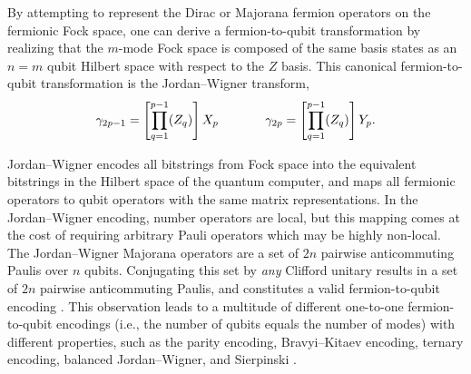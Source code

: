 \documentclass[%
 aip,
 amsmath,amssymb,
 reprint,%
]{revtex4-1}
\begin{document}
\indent By attempting to represent the Dirac or Majorana fermion operators on the fermionic Fock space, one can derive a fermion-to-qubit transformation by realizing that the $m$-mode Fock space is composed of the same basis states as an $n\!=\!m$ qubit Hilbert space with respect to the $Z$ basis. This canonical fermion-to-qubit transformation is the Jordan--Wigner transform, 
\begin{equation}
    \gamma_{2p-1} = \left[\prod_{q=1}^{p-1}(Z_q)\right]X_p \hspace{1.3cm} \gamma_{2p} = \left[\prod_{q=1}^{p-1}(Z_q)\right]Y_p.
    \label{eq:jordan-wigner-transform}
\end{equation}

Jordan--Wigner encodes all bitstrings from Fock space into the equivalent bitstrings in the Hilbert space of the quantum computer, and maps all fermionic operators to qubit operators with the same matrix representations. In the Jordan--Wigner encoding, number operators are local, but this mapping comes at the cost of requiring arbitrary Pauli operators which may be highly non-local. \\
\indent The Jordan--Wigner Majorana operators are a set of $2n$ pairwise anticommuting Paulis over $n$ qubits. Conjugating this set by {\it any} Clifford unitary results in a set of $2n$ pairwise anticommuting Paulis, and constitutes a valid fermion-to-qubit encoding \cite{gottesmanknill, Aaronson_2004, chiew2026optimalfermionqubitmappingsquadratic, Yu_2025}. This observation leads to a multitude of different one-to-one fermion-to-qubit encodings (i.e., the number of qubits equals the number of modes) with different properties, such as the parity encoding, Bravyi--Kitaev encoding, ternary encoding, balanced Jordan--Wigner, and Sierpinski \cite{harrison2024sierpinskitrianglefermiontoqubittransform, chiew2026optimalfermionqubitmappingsquadratic, Jiang_2020, Miller_2023}. \\
\end{document}
